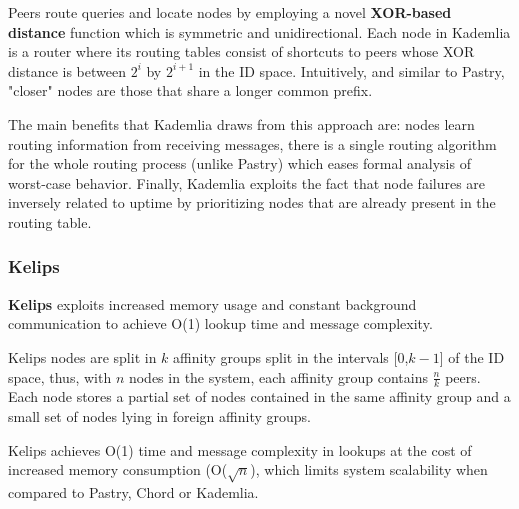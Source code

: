 Peers route queries and locate nodes by employing a novel \textbf{XOR-based distance} function which is symmetric and unidirectional. Each node in Kademlia is a router where its routing tables consist of shortcuts to peers whose XOR distance is between \(2^{i}\) by \(2^{i + 1}\) in the ID space. Intuitively, and similar to Pastry, "closer" nodes are those that share a longer common prefix.

The main benefits that Kademlia draws from this approach are: nodes learn routing information from receiving messages, there is a single routing algorithm for the whole routing process (unlike Pastry) which eases formal analysis of worst-case behavior. Finally, Kademlia exploits the fact that node failures are inversely related to uptime by prioritizing nodes that are already present in the routing table.

\subsubsection*{Kelips}

\textbf{Kelips} \cite{gupta2003kelips} exploits increased memory usage and constant background communication to achieve O(1) lookup time and message complexity. 

Kelips nodes are split in $k$ affinity groups split in the intervals [0,$k-1$] of the ID space, thus, with $n$ nodes in the system, each affinity group contains $\frac{n}{k}$ peers.  Each node stores a partial set of nodes contained in the same affinity group and a small set of nodes lying in foreign affinity groups.

Kelips achieves O(1) time and message complexity in lookups at the cost of increased memory consumption (O($\sqrt{n}$), which limits system scalability  when compared to Pastry, Chord or Kademlia. 





